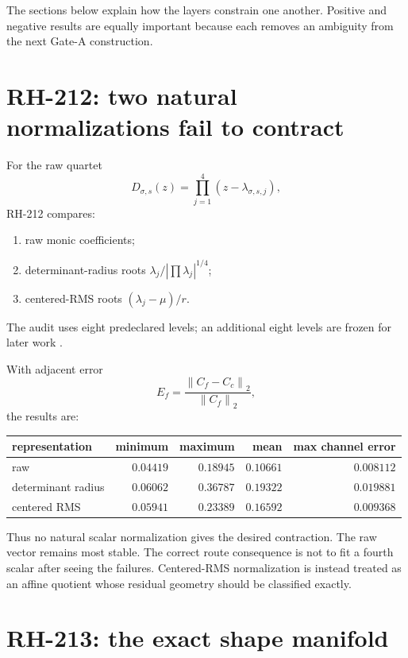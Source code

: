 \documentclass[12pt]{article}
\theoremstyle{remark}\newtheorem{remark}[theorem]{Remark}
\newcommand{\norm}[1]{\left\lVert#1\right\rVert}
\begin{document}
The sections below explain how the layers constrain one another.  Positive
and negative results are equally important because each removes an ambiguity
from the next Gate-A construction.

\section{RH-212: two natural normalizations fail to contract}

For the raw quartet
\begin{equation}
 D_{\sigma,s}(z)=\prod_{j=1}^{4}(z-\lambda_{\sigma,s,j}),
\end{equation}
RH-212 compares:
\begin{enumerate}[leftmargin=2em]
\item raw monic coefficients;
\item determinant-radius roots
$\lambda_j/|\prod\lambda_j|^{1/4}$;
\item centered-RMS roots
$(\lambda_j-\mu)/r$.
\end{enumerate}
The audit uses eight predeclared levels; an additional eight levels are frozen
for later work \citep{WangRH212}.

With adjacent error
\begin{equation}
 E_f=\frac{\norm{C_f-C_c}_2}{\norm{C_f}_2},
\end{equation}
the results are:
\begin{center}
\begin{tabular}{lrrrr}
\toprule
representation & minimum & maximum & mean & max channel error\\
\midrule
raw & $0.04419$ & $0.18945$ & $0.10661$ & $0.008112$\\
determinant radius & $0.06062$ & $0.36787$ & $0.19322$ & $0.019881$\\
centered RMS & $0.05941$ & $0.23389$ & $0.16592$ & $0.009368$\\
\bottomrule
\end{tabular}
\end{center}

Thus no natural scalar normalization gives the desired contraction.  The raw
vector remains most stable.  The correct route consequence is not to fit a
fourth scalar after seeing the failures.  Centered-RMS normalization is
instead treated as an affine quotient whose residual geometry should be
classified exactly.

\section{RH-213: the exact shape manifold}
\end{document}
